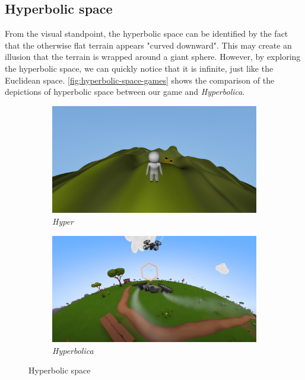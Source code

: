 \subsection{Hyperbolic space}
From the visual standpoint, the hyperbolic space can be identified by the fact that the otherwise flat terrain appears "curved downward".
This may create an illusion that the terrain is wrapped around a giant sphere.
However, by exploring the hyperbolic space, we can quickly notice that it is infinite, just like the Euclidean space.
\autoref{fig:hyperbolic-space-games} shows the comparison of the depictions of hyperbolic space between our game and \textit{Hyperbolica}.
\begin{figure}[!htb]
    \centering
    \begin{subfigure}[b]{0.475\textwidth}
        \centering
        \includegraphics[width=\textwidth]{chapters/results/sections/non_euclidean/resources/hyperbolic-in-hyper.png}
        \caption[]%
        {{\small \textit{Hyper}}}
        \label{fig:hyperbolic-space-games-hyper}
    \end{subfigure}
    \hfill
    \begin{subfigure}[b]{0.475\textwidth}
        \centering
        \includegraphics[width=\textwidth]{chapters/results/sections/non_euclidean/resources/hyperbolica-hyperbolic.png}
        \caption[]%
        {{\small \textit{Hyperbolica \cite{Hyperbolica-Hyperbolic}}}}
        \label{fig:hyperbolic-space-games-hyperbolica}
    \end{subfigure}
    \caption[]
    {\small Hyperbolic space}
    \label{fig:hyperbolic-space-games}
\end{figure}

